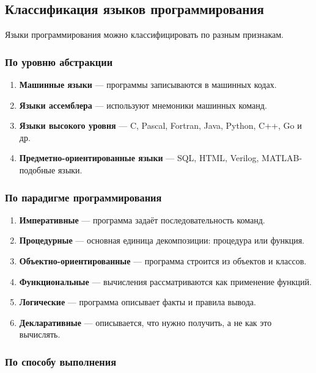 \documentclass[12pt,a4paper]{article}
\begin{document}
\subsection{Классификация языков программирования}

Языки программирования можно классифицировать по разным признакам.

\subsubsection{По уровню абстракции}

\begin{enumerate}
  \item \textbf{Машинные языки} --- программы записываются в машинных кодах.
  \item \textbf{Языки ассемблера} --- используют мнемоники машинных команд.
  \item \textbf{Языки высокого уровня} --- C, Pascal, Fortran, Java, Python, C++, Go и др.
  \item \textbf{Предметно-ориентированные языки} --- SQL, HTML, Verilog, MATLAB-подобные языки.
\end{enumerate}

\subsubsection{По парадигме программирования}

\begin{enumerate}
  \item \textbf{Императивные} --- программа задаёт последовательность команд.
  \item \textbf{Процедурные} --- основная единица декомпозиции: процедура или функция.
  \item \textbf{Объектно-ориентированные} --- программа строится из объектов и классов.
  \item \textbf{Функциональные} --- вычисления рассматриваются как применение функций.
  \item \textbf{Логические} --- программа описывает факты и правила вывода.
  \item \textbf{Декларативные} --- описывается, что нужно получить, а не как это вычислять.
\end{enumerate}

\subsubsection{По способу выполнения}
\end{document}
